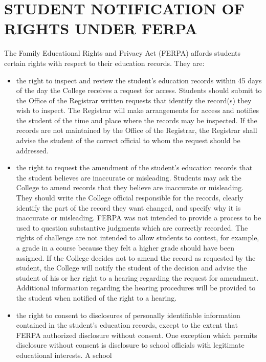 \documentclass[
  letterpaper,
]{scrbook}
\providecommand{\tightlist}{%
  \setlength{\itemsep}{0pt}\setlength{\parskip}{0pt}}
\begin{document}
\chapter{STUDENT NOTIFICATION OF RIGHTS UNDER
FERPA}\label{student-notification-of-rights-under-ferpa}

The Family Educational Rights and Privacy Act (FERPA) affords students
certain rights with respect to their education records. They are:

\begin{itemize}
\tightlist
\item
  the right to inspect and review the student's education records within
  45 days of the day the College receives a request for access. Students
  should submit to the Office of the Registrar written requests that
  identify the record(s) they wish to inspect. The Registrar will make
  arrangements for access and notifies the student of the time and place
  where the records may be inspected. If the records are not maintained
  by the Office of the Registrar, the Registrar shall advise the student
  of the correct official to whom the request should be addressed.
\item
  the right to request the amendment of the student's education records
  that the student believes are inaccurate or misleading. Students may
  ask the College to amend records that they believe are inaccurate or
  misleading. They should write the College official responsible for the
  records, clearly identify the part of the record they want changed,
  and specify why it is inaccurate or misleading. FERPA was not intended
  to provide a process to be used to question substantive judgments
  which are correctly recorded. The rights of challenge are not intended
  to allow students to contest, for example, a grade in a course because
  they felt a higher grade should have been assigned. If the College
  decides not to amend the record as requested by the student, the
  College will notify the student of the decision and advise the student
  of his or her right to a hearing regarding the request for amendment.
  Additional information regarding the hearing procedures will be
  provided to the student when notified of the right to a hearing.
\item
  the right to consent to disclosures of personally identifiable
  information contained in the student's education records, except to
  the extent that FERPA authorized disclosure without consent. One
  exception which permits disclosure without consent is disclosure to
  school officials with legitimate educational interests. A school

\end{itemize}
\end{document}
